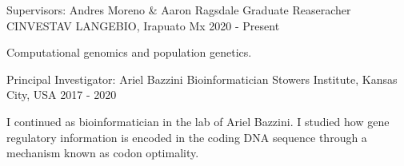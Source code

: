 

\begin{cventries}


 \cventry
        {Supervisors: Andres Moreno \& Aaron Ragsdale} %
        {Graduate Reaseracher} %
        {CINVESTAV LANGEBIO, Irapuato Mx} %
        {2020 - Present} %
        {
          \begin{cvitems} %
            \item {
            \begin{flushleft}
            Computational genomics and population genetics.
          \end{flushleft}
            }
          \end{cvitems}
        }

 \cventry
        {Principal Investigator: Ariel Bazzini} %
        {Bioinformatician} %
        {Stowers Institute, Kansas City, USA} %
        {2017 - 2020} %
        {
          \begin{cvitems} %
            \item {
            \begin{flushleft}
            I continued as bioinformatician in the lab of Ariel Bazzini. I studied how gene regulatory information is encoded in the coding DNA sequence 
            through a mechanism known as codon optimality.
          \end{flushleft}
            }
          \end{cvitems}
        }


\end{cventries}
